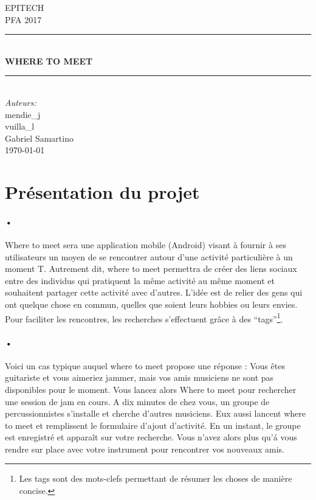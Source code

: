 \documentclass[pdftex,12pt,a4paper]{article}
\newcommand{\HRule}{\rule{\linewidth}{0.5mm}}
\begin{document}
\begin{titlepage}
\begin{center}

\textsc{\LARGE EPITECH}\\[1.5cm]
\textsc{\Large PFA 2017}\\[0.5cm]
\HRule \\[0.4cm]
{\huge \bfseries WHERE TO MEET \\[0.4cm]}
\HRule \\[1.5cm]

\emph{Auteurs:}\\
mendie\_j \\
vuilla\_l \\
Gabriel Samartino \\

\vfill
{\large \today}

\end{center}
\end{titlepage}
\section{Pr\'esentation du projet}
\paragraph{•}
Where to meet sera une application mobile (Android) visant \`a fournir \`a ses  utilisateurs un moyen de se rencontrer autour d’une activit\'e particuli\`ere à un moment T.
Autrement dit, where to meet permettra de cr\'eer des liens sociaux entre des individus qui pratiquent la m\^eme activit\'e au m\^eme moment et souhaitent partager cette activit\'e avec d’autres. L'id\'ee est de relier des gens qui ont quelque chose en commun, quelles que soient leurs hobbies ou leurs envies. 
Pour faciliter les rencontres, les recherches s'effectuent gr\^ace \`a des “tags”\footnote{Les tags sont des mots-clefs permettant de r\'esumer les choses de manière concise.
}.

\paragraph{•}
Voici un cas typique auquel where to meet propose une r\'eponse :
Vous \^etes guitariste et vous aimeriez jammer, mais vos amis musiciens ne sont pas disponibles pour le moment. Vous lancez alors Where to meet pour rechercher une session de jam en cours. A dix minutes de chez vous, un groupe de percussionnistes s'installe et cherche d’autres musiciens. Eux aussi lancent where to meet et remplissent le formulaire d’ajout d'activit\'e. En un instant, le groupe est enregistr\'e et appara\^it sur votre recherche. Vous n’avez alors plus qu’\'a vous rendre sur place avec votre instrument pour rencontrer vos nouveaux amis.
\end{document}
